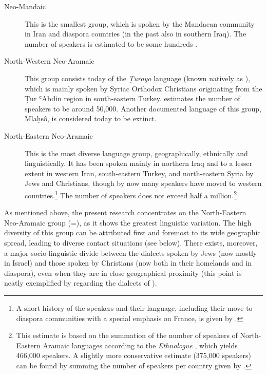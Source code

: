 \begin{description}
	\item[Neo-Mandaic]  This is the smallest group, which is spoken by the Mandaean  community in Iran and diaspora countries (in the past also in southern Iraq). The number of speakers is estimated to be some hundreds  \citep[16]{PoizatManuel}. 


	\item[North-Western Neo-Aramaic]  This group consists today of the \textit{Ṭuroyo} language (known natively as \textit{}), which is mainly spoken by Syriac Orthodox Christians originating from the Ṭur ʿAbdin region in south-eastern Turkey. \citet[16]{PoizatManuel} estimates the number of speakers to be around 50,000. Another documented language of this group, Mlaḥsô, is considered today to be extinct.

	\item[North-Eastern Neo-Aramaic]  This is  the most diverse language group,  geographically, ethnically and linguistically. It has been spoken mainly in northern Iraq and to a lesser extent in western Iran, south-eastern Turkey, and north-eastern Syria by Jews and Christians, though by now many speakers  have moved to western countries.\footnote{A short history of the speakers and their language, including their move to diaspora communities with a special emphasis on France, is given by \citet{AlichoranSibille}.} The number of speakers does not exceed half a million.\footnote{This estimate is based on the summation of the number of speakers of North-Eastern Aramaic languages according to the \textit{Ethnologue} \citep{Ethnologue17ed}, which yields 466,000 speakers. A slightly more conservative estimate (375,000 speakers) can be found by summing the number of speakers per country given by \citet[16--18]{PoizatManuel}. } 

\end{description}
	
	As mentioned above, the present research concentrates on the North-Eastern Neo-Aramaic  group (=), as it  shows the greatest linguistic variation.  The high diversity of this group can be attributed first and foremost to its wide geographic spread, leading to diverse contact situations (see below). There exists, moreover, a major socio-linguistic divide between the dialects spoken by Jews (now mostly in Israel) and those spoken by Christians (now both in their homelands and in diaspora), even when they are in  close geographical proximity (this point is neatly exemplified by \cite{MutzafiSalamas} regarding the dialects of \Salamas). 
	
